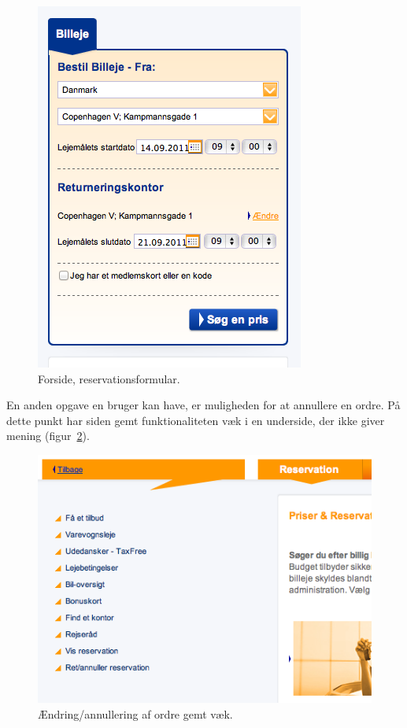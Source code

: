 \documentclass[a4paper]{article}
\begin{document}
\begin{figure}[htbp]
  \begin{center}
    \includegraphics[scale=.6]{1.png}
  \end{center}
  \caption{Forside, reservationsformular.}
  \label{forside}
\end{figure}

En anden opgave en bruger kan have, er muligheden for at annullere en ordre. På
dette punkt har siden gemt funktionaliteten væk i en underside, der ikke giver
mening (figur~\ref{annullering}).

\begin{figure}[htbp]
  \begin{center}
    \includegraphics[scale=.6]{3.png}
  \end{center}
  \caption{Ændring/annullering af ordre gemt væk.}
  \label{annullering}
\end{figure}
\end{document}
